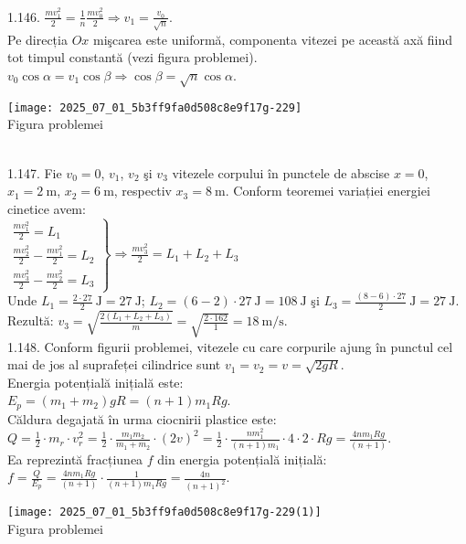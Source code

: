 1.146. $\frac{m v_{1}^{2}}{2}=\frac{1}{n} \frac{m v_{0}^{2}}{2} \Rightarrow v_{1}=\frac{v_{0}}{\sqrt{n}}$.\\ Pe direcția $O x$ mişcarea este uniformă, componenta vitezei pe această axă fiind tot timpul constantă (vezi figura problemei).\\ $v_{0} \cos \alpha=v_{1} \cos \beta \Rightarrow \cos \beta=\sqrt{n} \cos \alpha$.\\ \begin{center} \texttt{[image: 2025\_07\_01\_5b3ff9fa0d508c8e9f17g-229]}\\ Figura problemei \end{center}\\

1.147. Fie $v_{0}=0$, $v_{1}$, $v_{2}$ şi $v_{3}$ vitezele corpului în punctele de abscise $x=0$, $x_{1}=2 \mathrm{~m}$, $x_{2}=6 \mathrm{~m}$, respectiv $x_{3}=8 \mathrm{~m}$. Conform teoremei variației energiei cinetice avem:\\ $\left.\begin{array}{l} \frac{m v_{1}^{2}}{2}=L_{1}\\ \frac{m v_{2}^{2}}{2}-\frac{m v_{1}^{2}}{2}=L_{2}\\ \frac{m v_{3}^{2}}{2}-\frac{m v_{2}^{2}}{2}=L_{3} \end{array}\right\} \Rightarrow \frac{m v_{3}^{2}}{2}=L_{1}+L_{2}+L_{3}$\\ Unde $L_{1}=\frac{2 \cdot 27}{2} \mathrm{~J}=27 \mathrm{~J}$; $L_{2}=(6-2) \cdot 27 \mathrm{~J}=108 \mathrm{~J}$ şi $L_{3}=\frac{(8-6) \cdot 27}{2} \mathrm{~J}=27 \mathrm{~J}$.\\ Rezultă: $v_{3}=\sqrt{\frac{2\left(L_{1}+L_{2}+L_{3}\right)}{m}}=\sqrt{\frac{2 \cdot 162}{1}}=18 \mathrm{~m} / \mathrm{s}$.\\

1.148. Conform figurii problemei, vitezele cu care corpurile ajung în punctul cel mai de jos al suprafeței cilindrice sunt $v_{1}=v_{2}=v=\sqrt{2 g R}$.\\ Energia potențială inițială este:\\ $E_{p}=\left(m_{1}+m_{2}\right) g R=(n+1) m_{1} R g$.\\ Căldura degajată în urma ciocnirii plastice este:\\ $Q=\frac{1}{2} \cdot m_{r} \cdot v_{r}^{2}=\frac{1}{2} \cdot \frac{m_{1} m_{2}}{m_{1}+m_{2}} \cdot(2 v)^{2}=\frac{1}{2} \cdot \frac{n m_{1}^{2}}{(n+1) m_{1}} \cdot 4 \cdot 2 \cdot R g=\frac{4 n m_{1} R g}{(n+1)}$.\\ Ea reprezintă fracțiunea $f$ din energia potențială inițială:\\ $f=\frac{Q}{E_{p}}=\frac{4 n m_{1} R g}{(n+1)} \cdot \frac{1}{(n+1) m_{1} R g}=\frac{4 n}{(n+1)^{2}}$.\\ \begin{center} \texttt{[image: 2025\_07\_01\_5b3ff9fa0d508c8e9f17g-229(1)]}\\ Figura problemei \end{center}\\

